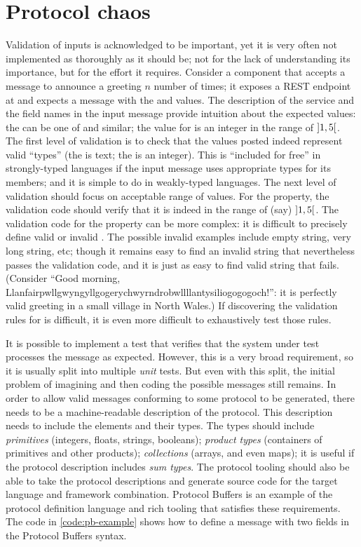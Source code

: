 \section{Protocol chaos}
Validation of inputs is acknowledged to be important, yet it is very often not implemented as thoroughly as it should be; not for the lack of understanding its importance, but for the effort it requires. Consider a component that accepts a message to announce a greeting $n$ number of times; it exposes a REST endpoint at  and expects a message with the  and  values. The description of the service and the field names in the input message provide intuition about the expected values: the  can be one of  and similar; the value for  is an integer in the range of $\interval[open]{1}{5}$. The first level of validation is to check that the values posted indeed represent valid ``types'' (the  is text; the  is an integer). This is ``included for free'' in strongly-typed languages if the input message uses appropriate types for its members; and it is simple to do in weakly-typed languages. The next level of validation should focus on acceptable range of values. For the  property, the validation code should verify that it is indeed in the range of (say) $\interval[open]{1}{5}$. The validation code for the  property can be more complex: it is difficult to precisely define valid or invalid . The possible invalid examples include empty string, very long string, etc; though it remains easy to find an invalid string that nevertheless passes the validation code, and it is just as easy to find valid string that fails. (Consider ``Good morning, Llanfairpwllgwyngyllgogerychwyrndrobwllllantysiliogogogoch!'': it is perfectly valid greeting in a small village in North Wales.) If discovering the validation rules for  is difficult, it is even more difficult to exhaustively test those rules. 

It is possible to implement a test that verifies that the system under test processes the message as expected. However, this is a very broad requirement, so it is usually split into multiple \emph{unit} tests. But even with this split, the initial problem of imagining and then coding the possible messages still remains. In order to allow valid messages conforming to some protocol to be generated, there needs to be a machine-readable description of the protocol. This description needs to include the elements and their types. The types should include \emph{primitives} (integers, floats, strings, booleans); \emph{product types} (containers of primitives and other products); \emph{collections} (arrays, and even maps); it is useful if the protocol description includes \emph{sum types}. The protocol tooling should also be able to take the protocol descriptions and generate source code for the target language and framework combination. Protocol Buffers \cite{protobuf} is an example of the protocol definition language and rich tooling that satisfies these requirements. The code in \autoref{code:pb-example} shows how to define a message  with two fields in the Protocol Buffers syntax.

